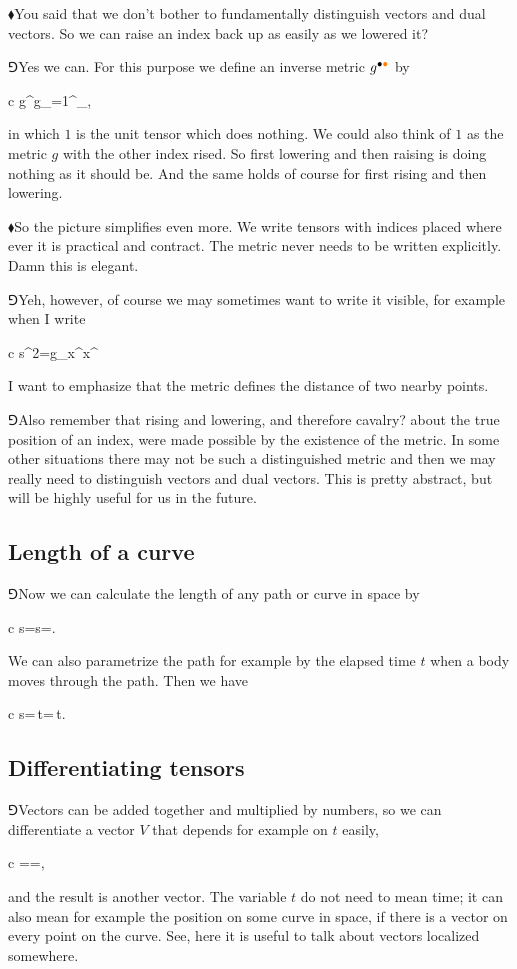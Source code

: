 \documentclass[10pt,oneside%
]{memoir}
\newenvironment{eqna}{\begin{IEEEeqnarray*}{c}}{\end{IEEEeqnarray*}\ignorespacesafterend}
\newcommand{\der}[2]{\frac{\dd#1}{\dd#2}}
\newcommand{\dd}{\mathrm{d}}
\newcommand{\coa}{{\color{black}\bullet}}
\newcommand{\cob}{{\color{oranssi}\bullet}}
\newcommand{\coc}{{\color{cyan}\bullet}}
\newcommand{\hea}{\(\blacklozenge\)\;}
\newcommand{\heb}{\(\Game\)\;}
\begin{document}
\hea You said that we don't bother to fundamentally distinguish vectors and dual vectors. So we can raise an index back up as easily as we lowered it?

\heb Yes we can. For this purpose we define an inverse metric \(g^{\coa\cob}\) by
\begin{eqna}
    g^{\coa\cob}g_{\cob\coc}=1^{\coa}_{\coc},
\end{eqna}
in which \(1\) is the unit tensor which does nothing. We could also think of \(1\) as the metric \(g\) with the other index rised. So first lowering and then raising is doing nothing as it should be. And the same holds of course for first rising and then lowering.

\hea So the picture simplifies even more. We write tensors with indices placed where ever it is practical and contract. The metric never needs to be written explicitly. Damn this is elegant.

\heb Yeh, however, of course we may sometimes want to write it visible, for example when I write
\begin{eqna}
    \dd s^2=g_{\coa\cob}\dd x^\coa\dd x^\cob
\end{eqna}
I want to emphasize that the metric defines the distance of two nearby points.

\heb Also remember that rising and lowering, and therefore cavalry? about the true position of an index, were made possible by the existence of the metric. In some other situations there may not be such a distinguished metric and then we may really need to distinguish vectors and dual vectors. This is pretty abstract, but will be highly useful for us in the future.
\subsection{Length of a curve}
\heb Now we can calculate the length of any path or curve in space by
\begin{eqna}
    s=\int\dd s=\int\sqrt{g_{\coa\cob}\dd x^\coa\dd x^\cob}.
\end{eqna}
We can also parametrize the path for example by the elapsed time \(t\) when a body moves through the path. Then we have
\begin{eqna}
    s=\int\sqrt{g_{\coa\cob}\der{x^\coa}{t}\der{x^\cob}{t}}\,\dd t=\int\sqrt{g_{\coa\cob}\dot{x}^\coa\dot{x}^\cob}\,\dd t.
\end{eqna}
\subsection{Differentiating tensors}
\heb Vectors can be added together and multiplied by numbers, so we can differentiate a vector \(V\) that depends for example on \(t\) easily,
\begin{eqna}
    =\frac{V(t+\dd t)-V(t)}{\dd t}=\der{V}{t},
\end{eqna}
and the result is another vector. The variable \(t\) do not need to mean time; it can also mean for example the position on some curve in space, if there is a vector on every point on the curve. See, here it is useful to talk about vectors localized somewhere.
\end{document}

